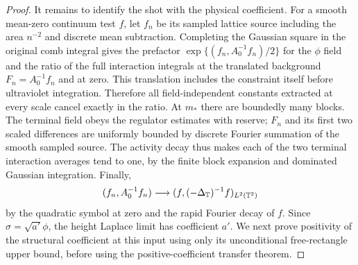 \begin{proof}
It remains to identify the shot with the physical coefficient.
For a smooth mean-zero continuum test $f$, let $f_n$ be its sampled
lattice source including the area $n^{-2}$ and discrete mean
subtraction.  Completing the Gaussian square in the original
comb integral gives the prefactor
$\exp\{(f_n,A_0^{-1}f_n)/2\}$ for the $\phi$ field and the ratio
of the full interaction integrals at the translated background
$F_n=A_0^{-1}f_n$ and at zero.  This translation includes the
constraint itself before ultraviolet integration.  Therefore all
field-independent constants extracted at every scale cancel
exactly in the ratio.  At $m_*$ there are boundedly many blocks.
The terminal field obeys the regulator estimates with reserve;
$F_n$ and its first two scaled differences are uniformly bounded
by discrete Fourier summation of the smooth sampled source.
The activity decay thus makes each of the two terminal interaction
averages tend to one, by the finite block expansion and dominated
Gaussian integration.  Finally,
\[
 (f_n,A_0^{-1}f_n)\longrightarrow
       (f,(-\Delta_{\mathbb T})^{-1}f)_{L^2(\mathbb T^2)}
\]
by the quadratic symbol at zero and the rapid Fourier decay of
$f$.  Since $\sigma=\sqrt{a'}\phi$, the height Laplace limit has
coefficient $a'$.  We next prove positivity of the structural
coefficient at this input using only its unconditional free-rectangle
upper bound, before using the positive-coefficient transfer theorem.


\end{proof}
